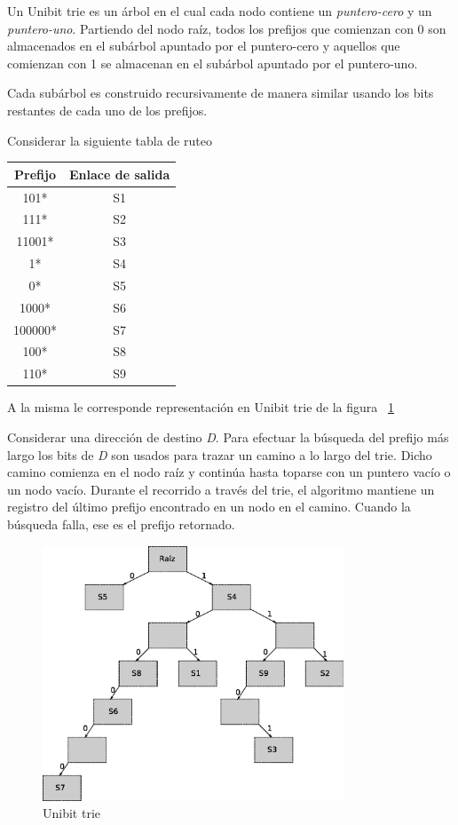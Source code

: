 Un Unibit trie es un árbol en el cual cada nodo contiene un \textit{puntero-cero }y un \textit{puntero-uno}. Partiendo del nodo raíz, todos los prefijos que comienzan con 0 son almacenados en el subárbol apuntado por el puntero-cero y aquellos que comienzan con 1 se almacenan en el subárbol apuntado por el puntero-uno.

Cada subárbol es construido recursivamente de manera similar usando los bits restantes de cada uno de los prefijos.

Considerar la siguiente tabla de ruteo

\begin{center}
	\begin{tabular}{|c|c|} \hline
		\textbf{Prefijo} & \textbf{Enlace de salida} \\ \hline
		101* & S1 \\
		111* & S2 \\
		11001* & S3 \\
		1* & S4 \\
		0* & S5 \\
		1000* & S6 \\
		100000* & S7 \\
		100* & S8 \\
		110* & S9 \\	\hline
	\end{tabular}	
\end{center}




A la misma le corresponde representación en Unibit trie de la figura ~\ref{fig:trie}

Considerar una dirección de destino \textit{D}. Para efectuar la búsqueda del prefijo más largo los bits de \textit{D} son usados para trazar un camino a lo largo del trie. Dicho camino comienza en el nodo raíz y continúa hasta toparse con un puntero vacío o un nodo vacío. Durante el recorrido a través del trie, el algoritmo mantiene un registro del último prefijo encontrado en un nodo en el camino. Cuando la búsqueda falla, ese es el prefijo retornado.
\newpage
\begin{figure}[h]
  \centering
	\includegraphics[width=0.80\textwidth]{2-sistema/graf/trie.eps}
  \caption{Unibit trie}
  \label{fig:trie}
\end{figure}


